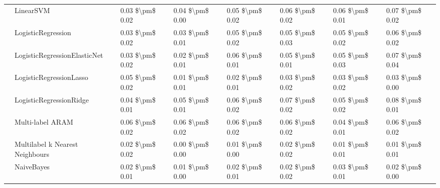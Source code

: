 \begin{tabular}{llllllll}
   & LinearSVM &  0.03 \$\textbackslash pm\$ 0.02 &           0.04 \$\textbackslash pm\$ 0.00 &       0.05 \$\textbackslash pm\$ 0.02 &        0.06 \$\textbackslash pm\$ 0.02 &                         0.06 \$\textbackslash pm\$ 0.01 &      0.07 \$\textbackslash pm\$ 0.02 \\
   & LogisticRegression &  0.03 \$\textbackslash pm\$ 0.02 &           0.03 \$\textbackslash pm\$ 0.01 &       0.05 \$\textbackslash pm\$ 0.02 &        0.05 \$\textbackslash pm\$ 0.03 &                         0.05 \$\textbackslash pm\$ 0.02 &      0.06 \$\textbackslash pm\$ 0.02 \\
   & LogisticRegressionElasticNet &  0.03 \$\textbackslash pm\$ 0.02 &           0.02 \$\textbackslash pm\$ 0.01 &       0.06 \$\textbackslash pm\$ 0.01 &        0.05 \$\textbackslash pm\$ 0.01 &                         0.05 \$\textbackslash pm\$ 0.03 &      0.07 \$\textbackslash pm\$ 0.04 \\
   & LogisticRegressionLasso &  0.05 \$\textbackslash pm\$ 0.02 &           0.01 \$\textbackslash pm\$ 0.01 &       0.02 \$\textbackslash pm\$ 0.01 &        0.03 \$\textbackslash pm\$ 0.02 &                         0.03 \$\textbackslash pm\$ 0.02 &      0.03 \$\textbackslash pm\$ 0.00 \\
   & LogisticRegressionRidge &  0.04 \$\textbackslash pm\$ 0.01 &           0.05 \$\textbackslash pm\$ 0.01 &       0.06 \$\textbackslash pm\$ 0.02 &        0.07 \$\textbackslash pm\$ 0.02 &                         0.05 \$\textbackslash pm\$ 0.02 &      0.08 \$\textbackslash pm\$ 0.01 \\
   & Multi-label ARAM &  0.06 \$\textbackslash pm\$ 0.02 &           0.06 \$\textbackslash pm\$ 0.02 &       0.06 \$\textbackslash pm\$ 0.02 &        0.06 \$\textbackslash pm\$ 0.02 &                         0.04 \$\textbackslash pm\$ 0.01 &      0.06 \$\textbackslash pm\$ 0.02 \\
   & Multilabel k Nearest Neighbours &  0.02 \$\textbackslash pm\$ 0.02 &           0.00 \$\textbackslash pm\$ 0.00 &       0.01 \$\textbackslash pm\$ 0.00 &        0.02 \$\textbackslash pm\$ 0.02 &                         0.01 \$\textbackslash pm\$ 0.01 &      0.01 \$\textbackslash pm\$ 0.01 \\
   & NaiveBayes &  0.02 \$\textbackslash pm\$ 0.01 &           0.01 \$\textbackslash pm\$ 0.00 &       0.02 \$\textbackslash pm\$ 0.01 &        0.02 \$\textbackslash pm\$ 0.02 &                         0.03 \$\textbackslash pm\$ 0.01 &      0.02 \$\textbackslash pm\$ 0.00 \\

\end{tabular}
